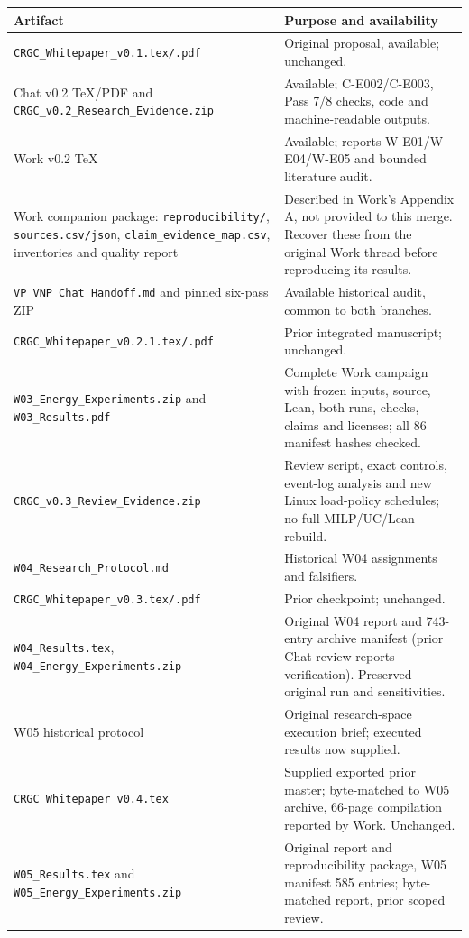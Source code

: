\documentclass[11pt,letterpaper]{article}
\begin{document}
\begin{longtable}{P{.42\linewidth}P{.49\linewidth}}
\toprule Artifact & Purpose and availability\\\midrule\endhead
\texttt{CRGC\_Whitepaper\_v0.1.tex/.pdf} & Original proposal, available; unchanged.\\
Chat v0.2 TeX/PDF and \texttt{CRGC\_v0.2\_Research\_Evidence.zip} & Available; C-E002/C-E003, Pass 7/8 checks, code and machine-readable outputs.\\
Work v0.2 TeX & Available; reports W-E01/W-E04/W-E05 and bounded literature audit.\\
Work companion package: \texttt{reproducibility/}, \texttt{sources.csv/json}, \texttt{claim\_evidence\_map.csv}, inventories and quality report & Described in Work's Appendix A, not provided to this merge. Recover these from the original Work thread before reproducing its results.\\
\texttt{VP\_VNP\_Chat\_Handoff.md} and pinned six-pass ZIP & Available historical audit, common to both branches.\\
\texttt{CRGC\_Whitepaper\_v0.2.1.tex/.pdf} & Prior integrated manuscript; unchanged.\\
\texttt{W03\_Energy\_Experiments.zip} and \texttt{W03\_Results.pdf} & Complete Work campaign with frozen inputs, source, Lean, both runs, checks, claims and licenses; all 86 manifest hashes checked.\\
\texttt{CRGC\_v0.3\_Review\_Evidence.zip} & Review script, exact controls, event-log analysis and new Linux load-policy schedules; no full MILP/UC/Lean rebuild.\\
\texttt{W04\_Research\_Protocol.md} & Historical W04 assignments and falsifiers.\\
\texttt{CRGC\_Whitepaper\_v0.3.tex/.pdf} & Prior checkpoint; unchanged.\\
\texttt{W04\_Results.tex}, \texttt{W04\_Energy\_Experiments.zip} & Original W04 report and 743-entry archive manifest (prior Chat review reports verification). Preserved original run and sensitivities.\\
W05 historical protocol & Original research-space execution brief; executed results now supplied.\\
\texttt{CRGC\_Whitepaper\_v0.4.tex} & Supplied exported prior master; byte-matched to W05 archive, 66-page compilation reported by Work. Unchanged.\\
\texttt{W05\_Results.tex} and \texttt{W05\_Energy\_Experiments.zip} & Original report and reproducibility package, W05 manifest 585 entries; byte-matched report, prior scoped review.\\

\end{longtable}
\end{document}
